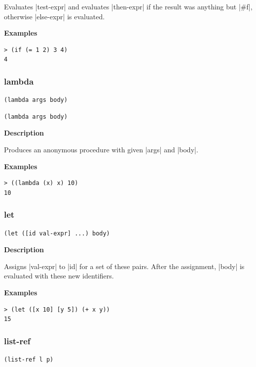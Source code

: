 \documentclass[a4paper]{article}
\begin{document}
Evaluates |test-expr| and evaluates |then-expr| if the result was anything but |#f|, otherwise |else-expr| is evaluated.

\textbf{Examples}

\begin{lstlisting}
> (if (= 1 2) 3 4)
4
\end{lstlisting}

\subsubsection{lambda}

\begin{lstlisting}[frame=none,belowskip=0pt]
(lambda args body)
\end{lstlisting}
\begin{lstlisting}[frame=none,language=SchemeLambda,aboveskip=0pt]
(lambda args body)
\end{lstlisting}

\textbf{Description}

Produces an anonymous procedure with given |args| and |body|.

\textbf{Examples}

\begin{lstlisting}
> ((lambda (x) x) 10)
10
\end{lstlisting}

\subsubsection{let}

\begin{lstlisting}[frame=none]
(let ([id val-expr] ...) body)
\end{lstlisting}

\textbf{Description}

Assigns |val-expr| to |id| for a set of these pairs. After the assignment, |body| is evaluated with these new identifiers.

\textbf{Examples}

\begin{lstlisting}
> (let ([x 10] [y 5]) (+ x y))
15
\end{lstlisting}

\subsubsection{list-ref}

\begin{lstlisting}[frame=none]
(list-ref l p)
\end{lstlisting}
\end{document}
